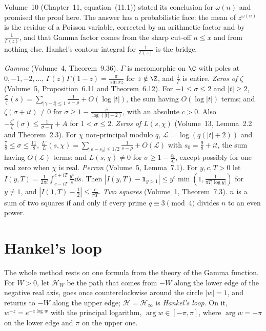 Volume~10 (Chapter~11, equation~(11.1)) stated its conclusion for $\omega(n)$ and promised the proof here. The answer has a probabilistic face: the mean of $z^{\omega(n)}$ is the residue of a Poisson variable, corrected by an arithmetic factor and by $\frac1{\Gamma(z)}$, and that Gamma factor comes from the sharp cut-off $n\le x$ and from nothing else. Hankel's contour integral for $\frac1{\Gamma(z)}$ is the bridge.

\begin{reminder}
\emph{Gamma} (Volume~4, Theorem~9.36). $\Gamma$ is meromorphic on $\C$ with poles at $0,-1,-2,\dots$, $\Gamma(z)\Gamma(1-z)=\frac\pi{\sin\pi z}$ for $z\notin\Z$, and $\frac1\Gamma$ is entire.
\emph{Zeros of $\zeta$} (Volume~5, Proposition~6.11 and Theorem~6.12). For $-1\le\sigma\le2$ and $|t|\ge2$, $\frac{\zeta'}\zeta(s)=\sum_{|\gamma-t|\le1}\frac1{s-\rho}+O(\log|t|)$, the sum having $O(\log|t|)$ terms; and $\zeta(\sigma+it)\ne0$ for $\sigma\ge1-\frac c{\log(|t|+2)}$, with an absolute $c>0$. Also $-\frac{\zeta'}\zeta(\sigma)\le\frac1{\sigma-1}+A$ for $1<\sigma\le2$.
\emph{Zeros of $L(s,\chi)$} (Volume~13, Lemma~2.2 and Theorem~2.3). For $\chi$ non-principal modulo $q$, $\mathcal L=\log(q(|t|+2))$ and $\frac78\le\sigma\le\frac{11}8$, $\frac{L'}L(s,\chi)=\sum_{|\rho-s_0|\le1/2}\frac1{s-\rho}+O(\mathcal L)$ with $s_0=\frac98+it$, the sum having $O(\mathcal L)$ terms; and $L(s,\chi)\ne0$ for $\sigma\ge1-\frac{c_1}{\mathcal L}$, except possibly for one real zero when $\chi$ is real.
\emph{Perron} (Volume~5, Lemma~7.1). For $y,c,T>0$ let $I(y,T)=\frac1{2\pi i}\int_{c-iT}^{c+iT}\frac{y^s}s\dd s$. Then $|I(y,T)-\mathbf 1_{y>1}|\le y^c\min(1,\frac1{\pi T|\log y|})$ for $y\ne1$, and $|I(1,T)-\frac12|\le\frac c{\pi T}$.
\emph{Two squares} (Volume~1, Theorem~7.3). $n$ is a sum of two squares if and only if every prime $q\equiv3\pmod4$ divides $n$ to an even power.
\end{reminder}

\section{Hankel's loop}

The whole method rests on one formula from the theory of the Gamma function. For $W>0$, let $\mathcal H_W$ be the path that comes from $-W$ along the lower edge of the negative real axis, goes once counterclockwise around the circle $|w|=1$, and returns to $-W$ along the upper edge; $\mathcal H=\mathcal H_\infty$ is \emph{Hankel's loop}. On it, $w^{-z}=e^{-z\log w}$ with the principal logarithm, $\arg w\in[-\pi,\pi]$, where $\arg w=-\pi$ on the lower edge and $\pi$ on the upper one.

